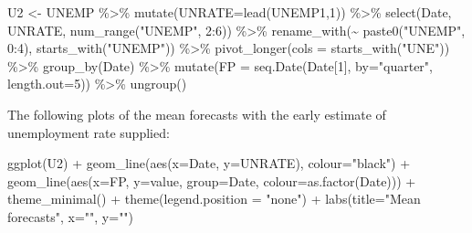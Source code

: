 \documentclass[
  letterpaper,
]{book}
\newenvironment{Shaded}{\begin{snugshade}}{\end{snugshade}}
\newcommand{\AttributeTok}[1]{\textcolor[rgb]{0.40,0.45,0.13}{#1}}
\newcommand{\DecValTok}[1]{\textcolor[rgb]{0.68,0.00,0.00}{#1}}
\newcommand{\FunctionTok}[1]{\textcolor[rgb]{0.28,0.35,0.67}{#1}}
\newcommand{\NormalTok}[1]{\textcolor[rgb]{0.00,0.23,0.31}{#1}}
\newcommand{\OtherTok}[1]{\textcolor[rgb]{0.00,0.23,0.31}{#1}}
\newcommand{\SpecialCharTok}[1]{\textcolor[rgb]{0.37,0.37,0.37}{#1}}
\newcommand{\StringTok}[1]{\textcolor[rgb]{0.13,0.47,0.30}{#1}}
\begin{document}
\begin{Shaded}
\begin{Highlighting}[]
\NormalTok{U2 }\OtherTok{\textless{}{-}}\NormalTok{ UNEMP }\SpecialCharTok{\%\textgreater{}\%}
  \FunctionTok{mutate}\NormalTok{(}\AttributeTok{UNRATE=}\FunctionTok{lead}\NormalTok{(UNEMP1,}\DecValTok{1}\NormalTok{)) }\SpecialCharTok{\%\textgreater{}\%}
  \FunctionTok{select}\NormalTok{(Date, UNRATE, }\FunctionTok{num\_range}\NormalTok{(}\StringTok{"UNEMP"}\NormalTok{, }\DecValTok{2}\SpecialCharTok{:}\DecValTok{6}\NormalTok{)) }\SpecialCharTok{\%\textgreater{}\%}
  \FunctionTok{rename\_with}\NormalTok{(}\SpecialCharTok{\textasciitilde{}} \FunctionTok{paste0}\NormalTok{(}\StringTok{"UNEMP"}\NormalTok{, }\DecValTok{0}\SpecialCharTok{:}\DecValTok{4}\NormalTok{), }\FunctionTok{starts\_with}\NormalTok{(}\StringTok{"UNEMP"}\NormalTok{)) }\SpecialCharTok{\%\textgreater{}\%}
  \FunctionTok{pivot\_longer}\NormalTok{(}\AttributeTok{cols =} \FunctionTok{starts\_with}\NormalTok{(}\StringTok{"UNE"}\NormalTok{)) }\SpecialCharTok{\%\textgreater{}\%} 
  \FunctionTok{group\_by}\NormalTok{(Date) }\SpecialCharTok{\%\textgreater{}\%} 
  \FunctionTok{mutate}\NormalTok{(}\AttributeTok{FP =} \FunctionTok{seq.Date}\NormalTok{(Date[}\DecValTok{1}\NormalTok{], }\AttributeTok{by=}\StringTok{"quarter"}\NormalTok{, }\AttributeTok{length.out=}\DecValTok{5}\NormalTok{)) }\SpecialCharTok{\%\textgreater{}\%}
  \FunctionTok{ungroup}\NormalTok{() }
\end{Highlighting}
\end{Shaded}

The following plots of the mean forecasts with the early estimate of
unemployment rate supplied:

\begin{Shaded}
\begin{Highlighting}[]
\FunctionTok{ggplot}\NormalTok{(U2) }\SpecialCharTok{+} 
  \FunctionTok{geom\_line}\NormalTok{(}\FunctionTok{aes}\NormalTok{(}\AttributeTok{x=}\NormalTok{Date, }\AttributeTok{y=}\NormalTok{UNRATE), }\AttributeTok{colour=}\StringTok{"black"}\NormalTok{) }\SpecialCharTok{+} 
  \FunctionTok{geom\_line}\NormalTok{(}\FunctionTok{aes}\NormalTok{(}\AttributeTok{x=}\NormalTok{FP, }\AttributeTok{y=}\NormalTok{value, }\AttributeTok{group=}\NormalTok{Date, }\AttributeTok{colour=}\FunctionTok{as.factor}\NormalTok{(Date))) }\SpecialCharTok{+} 
  \FunctionTok{theme\_minimal}\NormalTok{() }\SpecialCharTok{+}
  \FunctionTok{theme}\NormalTok{(}\AttributeTok{legend.position =} \StringTok{"none"}\NormalTok{) }\SpecialCharTok{+} 
  \FunctionTok{labs}\NormalTok{(}\AttributeTok{title=}\StringTok{"Mean forecasts"}\NormalTok{, }\AttributeTok{x=}\StringTok{""}\NormalTok{, }\AttributeTok{y=}\StringTok{""}\NormalTok{)}
\end{Highlighting}
\end{Shaded}
\end{document}
